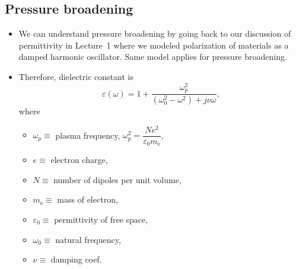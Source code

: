 \documentclass[11pt, oneside]{article}
\begin{document}
\subsection{Pressure broadening}
\label{s:pressure}

\begin{itemize}
	\item We can understand pressure broadening by going back to our discussion of permittivity in Lecture~1 where we modeled polarization of materials as a damped harmonic oscillator. Same model applies for pressure broadening.
	\item Therefore, dielectric constant is
	\begin{equation}
		\label{e:eps}
		\varepsilon(\omega) = 1 + \frac{\omega_p^2}{(\omega_0^2 - \omega^2) + j\nu\omega},
	\end{equation}
	where
	\begin{itemize}
		\item[] $\omega_p \equiv$ plasma frequency, $\omega_p^2 = \dfrac{Ne^2}{\varepsilon_0m_\mathrm{e}}$,
		\item[] $e \equiv$ electron charge,
		\item[] $N \equiv$ number of dipoles per unit volume,
		\item[] $m_\mathrm{e} \equiv$ mass of electron,
		\item[] $\varepsilon_0 \equiv$ permittivity of free space,
		\item[] $\omega_0 \equiv$ natural frequency,
		\item[] $\nu \equiv$ damping coef.
	\end{itemize}

\end{itemize}
\end{document}
